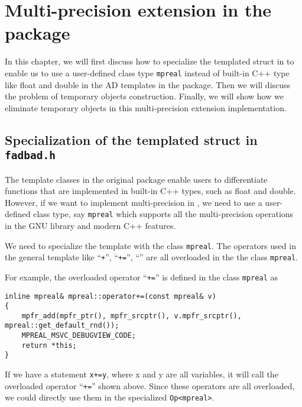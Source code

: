 
\chapter{Multi-precision extension in the \FADBADpp package}\label{ch:extension}
In this chapter, we will first discuss how to specialize the templated struct \Op in \fadbad to enable us to use a user-defined class type \texttt{mpreal} instead of built-in C++ type like float and double in the AD templates in the \FADBADpp package. Then we will discuss the problem of temporary objects construction. Finally, we will show how we eliminate temporary objects in this multi-precision extension implementation. 
\section{Specialization of the templated struct \Op in \textbf\texttt{fadbad.h}}\label{sc:opspecwithmpreal}
The template classes in the original \FADBADpp package enable users to differentiate functions that are implemented in built-in C++ types, such as float and double. However, if we want to implement multi-precision in \FADBADpp, we need to use a user-defined class type, say \texttt{mpreal} which supports all the multi-precision operations in the GNU \MPFR library and modern C++ features.

We need to specialize the template \Opn with the class \texttt{mpreal}. The operators used in the general template \Opn like ``{\tt +}'', ``{\tt +=}'', ``{\tt *}'' are all overloaded in the the class \texttt{mpreal}. 

For example, the overloaded operator ``{\tt +=}'' is defined in the class \texttt{mpreal} as
\begin{lstlisting}[numbers=none]
inline mpreal& mpreal::operator+=(const mpreal& v)
{
	mpfr_add(mpfr_ptr(), mpfr_srcptr(), v.mpfr_srcptr(), mpreal::get_default_rnd());
	MPREAL_MSVC_DEBUGVIEW_CODE;
	return *this;
}
\end{lstlisting}
If we have a statement {\tt x+=y}, where x and y are all \mpreal variables, it will call the overloaded operator ``{\tt +=}'' shown above. Since these operators are all overloaded, we could directly use them in the specialized {\tt Op<mpreal>}.

